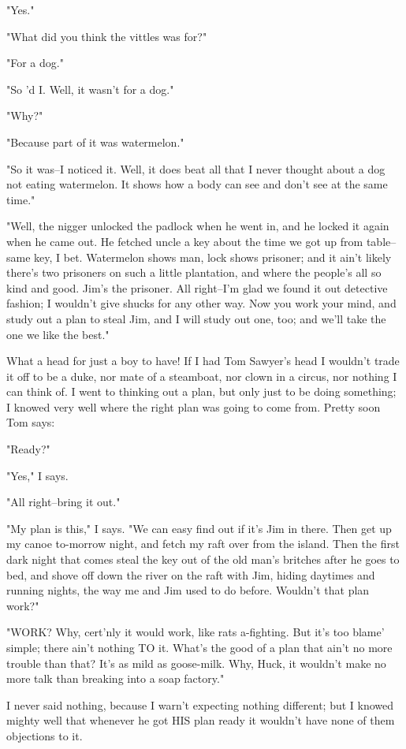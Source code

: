 "Yes."

"What did you think the vittles was for?"

"For a dog."

"So 'd I. Well, it wasn't for a dog."

"Why?"

"Because part of it was watermelon."

"So it was--I noticed it.  Well, it does beat all that I never thought
about a dog not eating watermelon.  It shows how a body can see and don't
see at the same time."

"Well, the nigger unlocked the padlock when he went in, and he locked it
again when he came out.  He fetched uncle a key about the time we got up
from table--same key, I bet.  Watermelon shows man, lock shows prisoner;
and it ain't likely there's two prisoners on such a little plantation,
and where the people's all so kind and good.  Jim's the prisoner.  All
right--I'm glad we found it out detective fashion; I wouldn't give
shucks for any other way.  Now you work your mind, and study out a plan
to steal Jim, and I will study out one, too; and we'll take the one we
like the best."

What a head for just a boy to have!  If I had Tom Sawyer's head I
wouldn't trade it off to be a duke, nor mate of a steamboat, nor clown in
a circus, nor nothing I can think of.  I went to thinking out a plan, but
only just to be doing something; I knowed very well where the right plan
was going to come from.  Pretty soon Tom says:

"Ready?"

"Yes," I says.

"All right--bring it out."

"My plan is this," I says.  "We can easy find out if it's Jim in there.
Then get up my canoe to-morrow night, and fetch my raft over from the
island.  Then the first dark night that comes steal the key out of the
old man's britches after he goes to bed, and shove off down the river on
the raft with Jim, hiding daytimes and running nights, the way me and Jim
used to do before.  Wouldn't that plan work?"

"WORK?  Why, cert'nly it would work, like rats a-fighting.  But it's too
blame' simple; there ain't nothing TO it.  What's the good of a plan that
ain't no more trouble than that?  It's as mild as goose-milk.  Why, Huck,
it wouldn't make no more talk than breaking into a soap factory."

I never said nothing, because I warn't expecting nothing different; but I
knowed mighty well that whenever he got HIS plan ready it wouldn't have
none of them objections to it.

